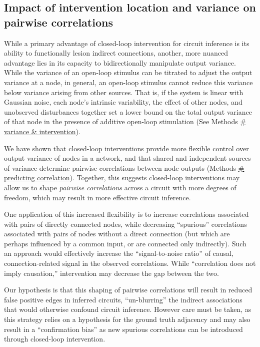 \documentclass{article}
\begin{document}
\hypertarget{impact-of-intervention-location-and-variance-on-pairwise-correlations}{%
\subsection{Impact of intervention location and variance on pairwise correlations}\label{impact-of-intervention-location-and-variance-on-pairwise-correlations}}

While a primary advantage of closed-loop intervention for circuit inference is its ability to functionally lesion indirect connections, another, more nuanced advantage lies in its capacity to bidirectionally manipulate output variance. While the variance of an open-loop stimulus can be titrated to adjust the output variance at a node, in general, an open-loop stimulus cannot reduce this variance below variance arising from other sources. That is, if the system is linear with Gaussian noise, each node's intrinsic variability, the effect of other nodes, and unobserved disturbances together set a lower bound on the total output variance of that node in the presence of additive open-loop stimulation
(See Methods \href{/section_content/methods_intervention_variance.md}{\#
variance \& intervention}).

We have shown that closed-loop interventions provide more flexible control over output variance of nodes in a network, and that shared and independent sources of variance determine pairwise correlations between node outputs (Methods
\href{/section_content/methods_predicting_correlation.md}{\# predicting correlation}). Together, this suggests closed-loop interventions may allow us to shape \emph{pairwise correlations} across a circuit with more degrees of freedom, which may result in more effective circuit inference.

One application of this increased flexibility is to increase correlations associated with pairs of directly connected nodes, while decreasing ``spurious'' correlations associated with pairs of nodes without a direct connection (but which are perhaps influenced by a common input, or are connected only indirectly). Such an approach would effectively increase the ``signal-to-noise ratio'' of causal, connection-related signal in the observed correlations. While
``correlation does not imply causation,'' intervention may decrease the gap between the two.

Our hypothesis is that this shaping of pairwise correlations will result in reduced false positive edges in inferred circuits, ``un-blurring''
the indirect associations that would otherwise confound circuit inference. However care must be taken, as this strategy relies on a hypothesis for the ground truth adjacency and may also result in a
``confirmation bias'' as new spurious correlations can be introduced through closed-loop intervention.
\end{document}
